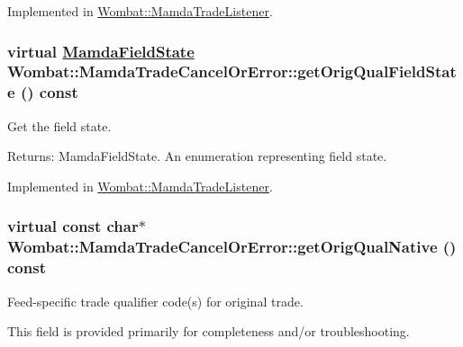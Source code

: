 Implemented in \hyperlink{classWombat_1_1MamdaTradeListener_65563a27266a0f48eff3f44b5a4216b7}{Wombat::Mamda\-Trade\-Listener}.\hypertarget{classWombat_1_1MamdaTradeCancelOrError_8204745a6698558a00ec0140622de754}{
\subsubsection[getOrigQualFieldState]{\setlength{\rightskip}{0pt plus 5cm}virtual \hyperlink{namespaceWombat_93aac974f2ab713554fd12a1fa3b7d2a}{Mamda\-Field\-State} Wombat::Mamda\-Trade\-Cancel\-Or\-Error::get\-Orig\-Qual\-Field\-State () const}}
\label{classWombat_1_1MamdaTradeCancelOrError_8204745a6698558a00ec0140622de754}


Get the field state. 

\begin{Desc}
\item[Returns:]Mamda\-Field\-State. An enumeration representing field state. \end{Desc}


Implemented in \hyperlink{classWombat_1_1MamdaTradeListener_04acb5179a6d640a0a54fd30df321b85}{Wombat::Mamda\-Trade\-Listener}.\hypertarget{classWombat_1_1MamdaTradeCancelOrError_905aa15d1b3b2b36fe28b395e059231a}{
\subsubsection[getOrigQualNative]{\setlength{\rightskip}{0pt plus 5cm}virtual const char$\ast$ Wombat::Mamda\-Trade\-Cancel\-Or\-Error::get\-Orig\-Qual\-Native () const}}
\label{classWombat_1_1MamdaTradeCancelOrError_905aa15d1b3b2b36fe28b395e059231a}


Feed-specific trade qualifier code(s) for original trade. 

This field is provided primarily for completeness and/or troubleshooting.

